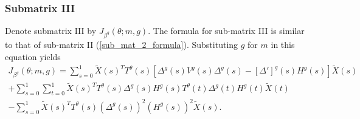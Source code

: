 \documentclass[12pt]{article}
\begin{document}
\begin{appendices}
\begin{refsection}
		\subsubsection*{Submatrix III}
		Denote submatrix III by $J_{\beta^g}(\theta; m, g).$ The formula for sub-matrix III is similar to that of sub-matrix II (\ref{sub_mat_2_formula}). Substituting $g$ for $m$ in this equation yields
		\begin{multline}\label{sub_mat_3_formula}
		J_{\beta^g}(\theta; m, g) = \sum_{s=0}^1 \tilde{X}(s)^T T^{\theta}(s) \left[{\Delta}^g(s) {V}^g(s) {\Delta}^g(s) - [{\Delta}']^g(s) {H}^g(s) \right] \tilde{X}(s) \\ + \sum_{s=0}^1 \sum_{t=0}^1 \tilde{X}(s)^T {T}^\theta(s) {\Delta}^g(s) {H}^g(s) {T}^\theta(t) {\Delta}^g(t) {H}^g(t) \tilde{X}(t) \\ - \sum_{s=0}^1 \tilde{X}(s)^T T^{\theta}(s) ({\Delta}^g(s))^2 ({H}^g(s))^2 \tilde{X}(s).
		\end{multline}
		

\end{refsection}
\end{appendices}
\end{document}
